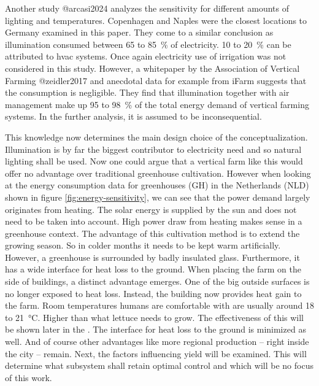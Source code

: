 Another study @arcasi2024 analyzes the sensitivity for different amounts of lighting and temperatures.
Copenhagen and Naples were the closest locations to Germany examined in this paper.
They come to a similar conclusion as illumination consumed between 65 to \SI{85}{\percent} of electricity.
10 to \SI{20}{\percent} can be attributed to \ac{hvac} systems.
Once again electricity use of irrigation was not considered in this study.
However, a whitepaper by the Association of Vertical Farming @zeidler2017 and anecdotal data for example from iFarm suggests that the consumption is negligible.
They find that illumination together with air management make up 95 to \SI{98}{\percent} of the total energy demand of vertical farming systems.
In the further analysis, it is assumed to be inconsequential.

This knowledge now determines the main design choice of the conceptualization.
Illumination is by far the biggest contributor to electricity need and so natural lighting shall be used.
Now one could argue that a vertical farm like this would offer no advantage over traditional greenhouse cultivation.
However when looking at the energy consumption data for greenhouses (GH) in the Netherlands (NLD) shown in figure \ref{fig:energy-sensitivity}, we can see that the power demand largely originates from heating.
The solar energy is supplied by the sun and does not need to be taken into account.
High power draw from heating makes sense in a greenhouse context.
The advantage of this cultivation method is to extend the growing season.
So in colder months it needs to be kept warm artificially.
However, a greenhouse is surrounded by badly insulated glass.
Furthermore, it has a wide interface for heat loss to the ground.
When placing the farm on the side of buildings, a distinct advantage emerges.
One of the big outside surfaces is no longer exposed to heat loss.
Instead, the building now provides heat gain to the farm.
Room temperatures humans are comfortable with are usually around 18 to \SI{21}{\degreeCelsius}.
Higher than what lettuce needs to grow.
The effectiveness of this will be shown later in the .
The interface for heat loss to the ground is minimized as well.
And of course other advantages like more regional production -- right inside the city -- remain.
Next, the factors influencing yield will be examined.
This will determine what subsystem shall retain optimal control and which will be no focus of this work.

